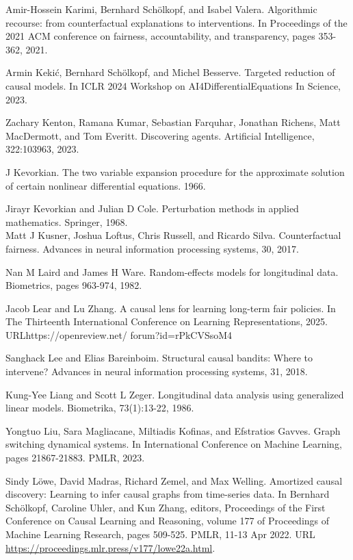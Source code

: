 \documentclass[10pt]{article}
\begin{document}
Amir-Hossein Karimi, Bernhard Schölkopf, and Isabel Valera. Algorithmic recourse: from counterfactual explanations to interventions. In Proceedings of the 2021 ACM conference on fairness, accountability, and transparency, pages 353-362, 2021.

Armin Kekić, Bernhard Schölkopf, and Michel Besserve. Targeted reduction of causal models. In ICLR 2024 Workshop on AI4DifferentialEquations In Science, 2023.

Zachary Kenton, Ramana Kumar, Sebastian Farquhar, Jonathan Richens, Matt MacDermott, and Tom Everitt. Discovering agents. Artificial Intelligence, 322:103963, 2023.

J Kevorkian. The two variable expansion procedure for the approximate solution of certain nonlinear differential equations. 1966.

Jirayr Kevorkian and Julian D Cole. Perturbation methods in applied mathematics. Springer, 1968.\\
Matt J Kusner, Joshua Loftus, Chris Russell, and Ricardo Silva. Counterfactual fairness. Advances in neural information processing systems, 30, 2017.

Nan M Laird and James H Ware. Random-effects models for longitudinal data. Biometrics, pages 963-974, 1982.

Jacob Lear and Lu Zhang. A causal lens for learning long-term fair policies. In The Thirteenth International Conference on Learning Representations, 2025. URLhttps://openreview.net/ forum?id=rPkCVSsoM4

Sanghack Lee and Elias Bareinboim. Structural causal bandits: Where to intervene? Advances in neural information processing systems, 31, 2018.

Kung-Yee Liang and Scott L Zeger. Longitudinal data analysis using generalized linear models. Biometrika, 73(1):13-22, 1986.

Yongtuo Liu, Sara Magliacane, Miltiadis Kofinas, and Efstratios Gavves. Graph switching dynamical systems. In International Conference on Machine Learning, pages 21867-21883. PMLR, 2023.

Sindy Löwe, David Madras, Richard Zemel, and Max Welling. Amortized causal discovery: Learning to infer causal graphs from time-series data. In Bernhard Schölkopf, Caroline Uhler, and Kun Zhang, editors, Proceedings of the First Conference on Causal Learning and Reasoning, volume 177 of Proceedings of Machine Learning Research, pages 509-525. PMLR, 11-13 Apr 2022. URL \href{https://proceedings.mlr.press/v177/lowe22a.html}{https://proceedings.mlr.press/v177/lowe22a.html}.
\end{document}
